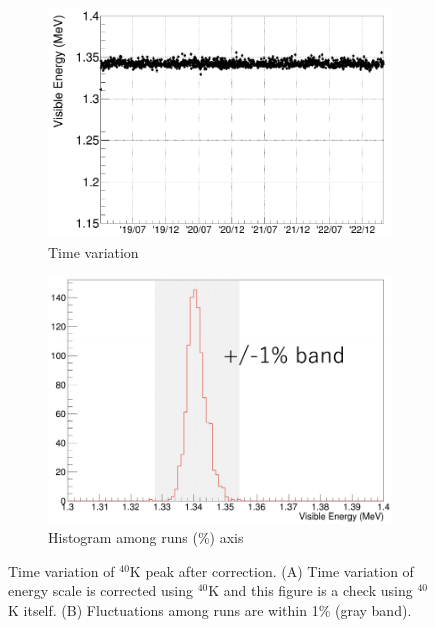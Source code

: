 \begin{figure}[htb]
    \centering
    \begin{subfigure}[b]{0.48\textwidth}
        \centering
        \includegraphics[width=\textwidth]{K40_PEEK_Time.png}
        \caption{Time variation}
        \label{fig:time_variation}
    \end{subfigure}
    \hfill
    \begin{subfigure}[b]{0.48\textwidth}
        \centering
        \includegraphics[width=\textwidth]{PEEK_energy.png}
        \caption{Histogram among runs (\%) axis}
        \label{fig:histogram}
    \end{subfigure}
    
    \caption{Time variation of $^{40}$K peak after correction. (A) Time variation of 
    energy scale is corrected using $^{40}$K and this figure is a check using $^{40}$K itself. 
    (B) Fluctuations among runs are within 1\% (gray band).}
    \label{fig:figure51}
\end{figure}
